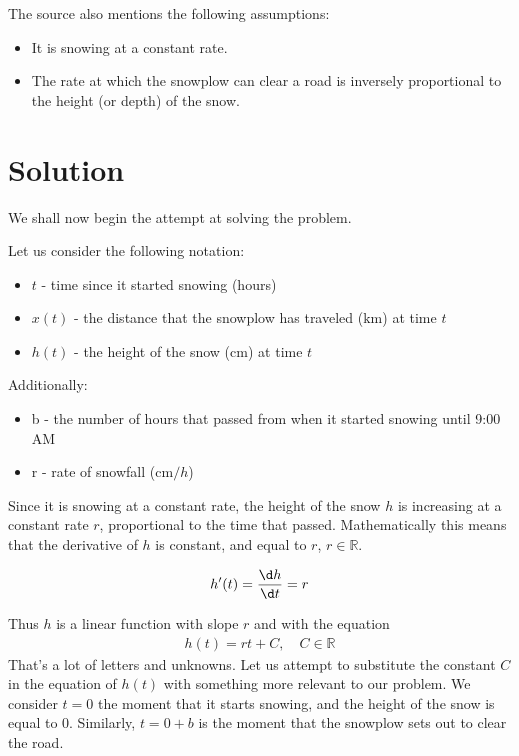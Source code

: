 \documentclass[a4paper,12pt]{article}
\begin{document}
    The source also mentions the following assumptions:
    \begin{itemize}
        \item It is snowing at a constant rate.
        \item The rate at which the snowplow can clear a road is inversely proportional to the height (or depth) of the snow.
    \end{itemize}

\section{Solution}
    We shall now begin the attempt at solving the problem. 

    \noindent Let us consider the following notation:
    \begin{itemize}
        \item $t$ - time since it started snowing (hours)
        \item $x(t)$ - the distance that the snowplow has traveled ($\unit{\kilo\meter}$) at time $t$
        \item $h(t)$ - the height of the snow ($\unit{\centi\meter}$) at time $t$
    \end{itemize}
    Additionally:
    \begin{itemize}
        \item b - the number of hours that passed from when it started snowing until 9:00 AM
        \item r - rate of snowfall ($\unit{\centi\meter / h}$)
    \end{itemize}

    Since it is snowing at a constant rate, the height of the snow $h$ is increasing at a constant rate $r$, proportional to the time that passed. Mathematically this means that the derivative of $h$ is constant, and equal to $r$, $r \in \mathbb{R}$.
    
    \begin{align*}
        h'(t) = \frac{\d h}{\d t} = r
    \end{align*}

    Thus $h$ is a linear function with slope $r$ and with the equation
    \begin{align*}
        h(t) = r t+ C, \quad C \in \mathbb{R}
    \end{align*}
    That's a lot of letters and unknowns. Let us attempt to substitute the constant $C$ in the equation of $h(t)$ with something more relevant to our problem.
    We consider $t = 0$ the moment that it starts snowing, and the height of the snow is equal to $0$. Similarly, $t = 0+b$ is the moment that the snowplow sets out to clear the road.
    
\end{document}

